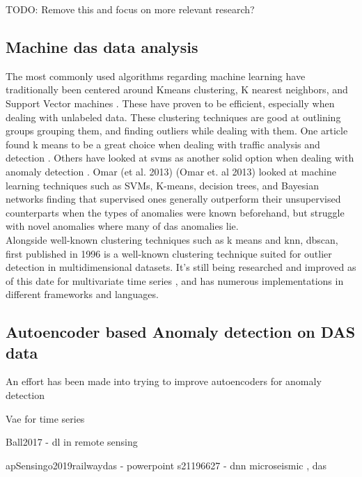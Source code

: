 TODO: Remove this and focus on more relevant research?
\subsection{Machine \acrshort{das} data analysis}

The most commonly used algorithms regarding machine learning have traditionally been centered around Kmeans clustering, K nearest neighbors, and  Support Vector machines \cite{10.14778/3538598.3538602, 10.1145/3444690}. These have proven to be efficient, especially when dealing with unlabeled data. These clustering techniques are good at outlining groups grouping them, and finding outliers while dealing with them. One article found k means to be a great choice when dealing with traffic analysis and detection \cite{7507933}. Others have looked at svms as another solid option when dealing with anomaly detection \cite{10.1007/978-3-540-28647-9_97}. Omar (et al. 2013) (Omar et. al 2013) \cite{omar2013machine} looked at machine learning techniques such as SVMs, K-means, decision trees, and Bayesian networks finding that supervised ones generally outperform their unsupervised counterparts when the types of anomalies were known beforehand, but struggle with novel anomalies where many of \acrshort{das} anomalies lie. \\ 

Alongside well-known clustering techniques such as k means and knn, \acrfull{dbscan}, first published in 1996 \cite{10.5555/3001460.3001507} is a well-known clustering technique suited for outlier detection in multidimensional datasets. It's still being researched and improved as of this date for multivariate time series \cite{waltz2024time}, and has numerous implementations in different frameworks and languages.  


\subsection{Autoencoder based Anomaly detection on DAS data}

An effort has been made into trying to improve autoencoders for anomaly detection \cite{tan2023improving}

Vae for time series \cite{desai2021timevae}


Ball2017 - dl in remote sensing

apSensingo2019railwaydas - powerpoint
s21196627 - dnn microseismic , das


